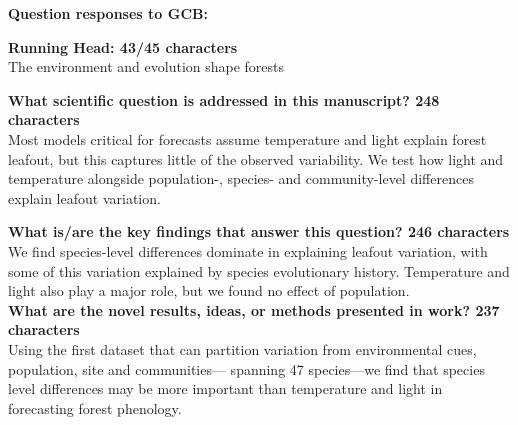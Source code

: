 \documentclass{letter}
\begin{document}
\textbf{Question responses to GCB:}


\textbf{Running Head: 43/45 characters}\\

The environment and evolution shape forests 


\textbf{What scientific question is addressed in this manuscript? 248 characters}\\


Most models critical for forecasts assume temperature and light explain forest leafout, but this captures little of the observed variability. We test how light and temperature alongside population-, species- and community-level differences explain leafout variation. %

\textbf{What is/are the key findings that answer this question? 246 characters}\\


We find species-level differences dominate in explaining leafout variation, with some of this variation explained by species evolutionary history. Temperature and light also play a major role, but we found no effect of population.  \\

\textbf{What are the novel results, ideas, or methods presented in work? 237 characters}\\
Using the first dataset that can partition variation from environmental cues, population, site and communities--- spanning 47 species---we find that species level differences may be more important than temperature and light in forecasting forest phenology. \\
\end{document}
